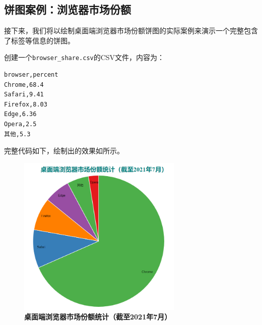 \subsection{饼图案例：浏览器市场份额}

接下来，我们将以绘制桌面端浏览器市场份额饼图的实际案例来演示一个完整包含了标签等信息的饼图。

创建一个\verb|browser_share.csv|的CSV文件，内容为：

\begin{verbatim}
browser,percent
Chrome,68.4
Safari,9.41
Firefox,8.03
Edge,6.36
Opera,2.5
其他,5.3
\end{verbatim}

完整代码如下，绘制出的效果如所示。

\begin{figure}[htbp]
    \centering
    \includegraphics[width=0.7\textwidth]{figure/D3/pie_browser_share.png}
    \caption{\textbf{桌面端浏览器市场份额统计（截至2021年7月）}}
    \label{fig:pie_browser_share}
\end{figure}


